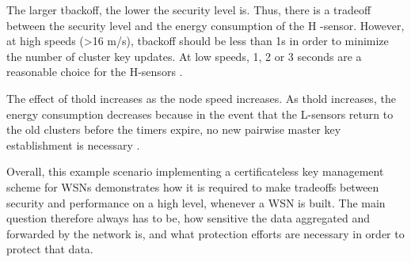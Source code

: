 \documentclass[12pt,a4paper,twoside]{report}
\begin{document}

The larger tbackoff, the lower the security level is. Thus, there is a tradeoff between the security level and the energy consumption of the H -sensor. However, at high speeds (>16 m/s), tbackoff should be less than 1s in order to minimize the number of cluster key updates. At low speeds, 1, 2 or 3 seconds are a reasonable choice for the H-sensors \cite{seo;etal:2015}.\par 
The effect of thold increases as the node speed increases. As thold increases, the energy consumption decreases because in the event that the L-sensors return to the old clusters before the timers expire, no new pairwise master key establishment is necessary \cite{seo;etal:2015}.\par
Overall, this example scenario implementing a certificateless key management scheme for WSNs demonstrates how it is required to make tradeoffs between security and performance on a high level, whenever a WSN is built. The main question therefore always has to be, how sensitive the data aggregated and forwarded by the network is, and what protection efforts are necessary in order to protect that data.
\end{document}
